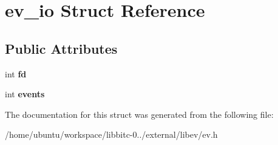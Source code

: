 \hypertarget{structev__io}{\section{ev\-\_\-io Struct Reference}
\label{structev__io}
}
\subsection*{Public Attributes}
\begin{DoxyCompactItemize}
\item 
\hypertarget{structev__io_a5c7e481bb08731a54a00c341d3fccb69}{int {\bfseries fd}}\label{structev__io_a5c7e481bb08731a54a00c341d3fccb69}

\item 
\hypertarget{structev__io_a439e3de48a504c0a64cc710338ce1349}{int {\bfseries events}}\label{structev__io_a439e3de48a504c0a64cc710338ce1349}

\end{DoxyCompactItemize}


The documentation for this struct was generated from the following file\-:\begin{DoxyCompactItemize}
\item 
/home/ubuntu/workspace/libbitc-\/0../external/libev/ev.\-h\end{DoxyCompactItemize}
